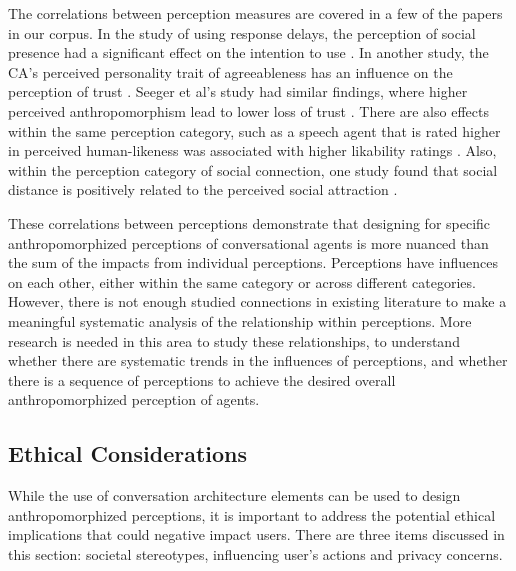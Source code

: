 \documentclass[sigconf,screen,review, anonymous]{acmart}
\newcommand{\cmt}[1]{}%
\begin{document}
The correlations between perception measures are covered in a few of the papers in our corpus. In the study of using response delays, the perception of social presence had a significant effect on the intention to use \cite{gnewuch2022opposing}\cmt{[20]}. In another study, the CA's perceived personality trait of agreeableness has an influence on the perception of trust \cite{andrews2012system}\cmt{[38]}. Seeger et al's study had similar findings, where higher perceived anthropomorphism lead to lower loss of trust \cite{seeger2021chatbots}\cmt{[35]}. There are also effects within the same perception category, such as a speech agent that is rated higher in perceived human-likeness was associated with higher likability ratings \cite{zhu2022effects}\cmt{[26]}. Also, within the perception category of social connection, one study found that social distance is positively related to the perceived social attraction \cite{westerman2019believe}\cmt{[9]}. 

These correlations between perceptions demonstrate that designing for specific anthropomorphized perceptions of conversational agents is more nuanced than the sum of the impacts from individual perceptions. Perceptions have influences on each other, either within the same category or across different categories. However, there is not enough studied connections in existing literature to make a meaningful systematic analysis of the relationship within perceptions. More research is needed in this area to study these relationships, to understand whether there are systematic trends in the influences of perceptions, and whether there is a sequence of perceptions to achieve the desired overall anthropomorphized perception of agents.

\subsection{Ethical Considerations}

While the use of conversation architecture elements can be used to design anthropomorphized perceptions, it is important to address the potential ethical implications that could negative impact users. There are three items discussed in this section: societal stereotypes, influencing user's actions and privacy concerns.
\end{document}
